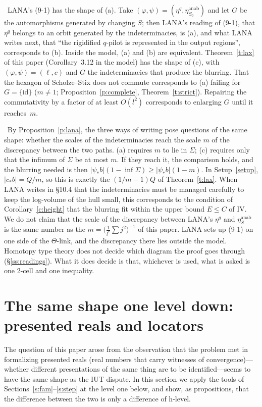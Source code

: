 \documentclass[11pt,a4paper]{article}
\newcommand{\id}{\mathrm{id}}
\newcommand{\anab}{\mathrm{anab}}
\newcommand{\lab}[2]{{\upshape\fcolorbox{#1}{#1!8}{\scriptsize\sffamily\bfseries\textcolor{#1}{#2}}}}
\newcommand{\tagH}{\lab{BurntOrange}{H}}
\newcommand{\q}[1]{``#1''}
\theoremstyle{plain}
\theoremstyle{definition}
\theoremstyle{remark}
\begin{document}
\tagH\ LANA's (9-1) has the shape of (a). Take $(\varphi,\psi)=(\eta^q,\eta^{\anab}_{S_0})$ and let $G$ be the
automorphisms generated by changing $S$; then LANA's reading of (9-1), that $\eta^q$ belongs to an orbit generated by
the indeterminacies, is (a), and what LANA writes next, that \q{the rigidified $q$-pilot is represented in the output regions}, corresponds to (b). Inside the model, (a) and (b) are equivalent. Theorem~\ref{t:lax} of
this paper (Corollary~3.12 in the model) has the shape of (c), with $(\varphi,\psi)=(\ell,c)$ and $G$ the
indeterminacies that produce the blurring. That the hexagon of Scholze--Stix does not commute corresponds to (a)
failing for $G=\{\id\}$ ($m\ne1$; Proposition~\ref{p:complete}, Theorem~\ref{t:strict}). Repairing the commutativity by a
factor of at least $O(l^2)$ corresponds to enlarging $G$ until it reaches~$m$.

\tagH\ By Proposition~\ref{p:lana}, the three ways of writing pose questions of the same shape: whether the scales of
the indeterminacies reach the scale $m$ of the discrepancy between the two paths. (a) requires $m$ to lie in $\Sigma$;
(c) requires only that the infimum of $\Sigma$ be at most $m$. If they reach it, the comparison holds, and the blurring
needed is then $|\psi_*b|(1-\inf\Sigma)\ge|\psi_*b|(1-m)$. In Setup~\ref{setup}, $|c_*b|=Q/m$, so this is exactly the
$(1/m-1)Q$ of Theorem~\ref{t:lax}. When LANA writes in \S10.4 that the indeterminacies must be managed carefully to keep
the log-volume of the hull small, this corresponds to the condition of Corollary~\ref{c:height} that the blurring fit
within the upper bound $E\le C$ of IV. We do not claim that the scale of the discrepancy between LANA's $\eta^q$ and
$\eta^{\anab}_S$ is the same number as the $m=\bigl(\frac{1}{l^\ast}\sum j^2\bigr)^{-1}$ of this paper. LANA sets up
(9-1) on one side of the $\Theta$-link, and the discrepancy there lies outside the model. Homotopy type theory does not
decide which diagram the proof goes through (\S\ref{ss:readings}). What it does decide is that, whichever is used, what
is asked is one 2-cell and one inequality.

\section{The same shape one level down: presented reals and locators}\label{s:down}
The question of this paper arose from the observation that the problem met in formalizing presented reals (real
numbers that carry witnesses of convergence)---whether different presentations of the same thing are to be
identified---seems to have the same shape as the IUT dispute. In this section we apply the tools of
Sections~\ref{s:fam}--\ref{s:step} at the level one below, and show, as propositions, that the difference between the
two is only a difference of h-level.
\end{document}
